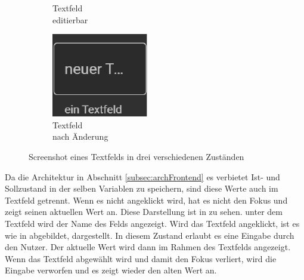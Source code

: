 \begin{figure}[ht]
\begin{subfigure}[h]{0.24\textwidth}
    \caption{Textfeld \\editierbar}
    \label{fig:frontend:poc:textFeld:focus}
  \end{subfigure}
  \hfill
  \begin{subfigure}[h]{0.24\textwidth}
    \centering
    \includegraphics[width=\textwidth]{content/hauptteil/umsetzungPoC/frontend/res/TextfeldNeuerText.pdf}
    \caption{Textfeld \\nach Änderung}
    \label{fig:frontend:poc:textFeld:nachAenderung}
  \end{subfigure}
  \hspace{0.05\textwidth}
  \caption[Screenshot, Zustände eines Textfelds]{Screenshot eines Textfelds in drei verschiedenen Zuständen}
  \label{fig:frontend:poc:textFeld}
\end{figure}
Da die Architektur in Abschnitt \ref{subsec:archFrontend} es verbietet Ist- und Sollzustand in der selben Variablen zu speichern, sind diese Werte auch im Textfeld getrennt.
Wenn es nicht angeklickt wird, hat es nicht den Fokus und zeigt seinen aktuellen Wert an. 
Diese Darstellung ist in  zu sehen. unter dem Textfeld wird der Name des Felds angezeigt.
Wird das Textfeld angeklickt, ist es wie in  abgebildet, dargestellt. 
In diesem Zustand erlaubt es eine Eingabe durch den Nutzer.
Der aktuelle Wert wird dann im Rahmen des Textfelds angezeigt. 
Wenn das Textfeld abgewählt wird und damit den Fokus verliert, wird die Eingabe verworfen und es zeigt wieder den alten Wert an.
